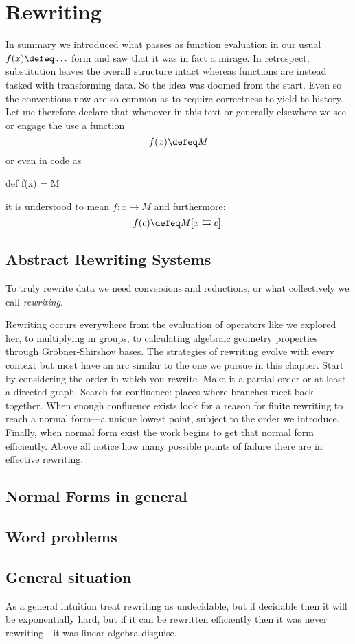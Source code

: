 % 

\section{Rewriting}
In summary we introduced what passes as function evaluation 
in our usual $f(x)\defeq \ldots$ form and saw that it was in fact 
a mirage.  In retrospect, substitution leaves the overall structure 
intact whereas functions are instead tasked with transforming data.
So the idea was doomed from the start.  Even so the conventions now 
are so common as to require correctness to yield to history.
Let me therefore declare that whenever in this text or generally 
elsewhere we see or engage the use a function
\[
    f(x)\defeq M
\]
or even in code as 
\begin{Pcode}[]
def f(x) = M
\end{Pcode}
it is understood to mean $f:x\mapsto M$ and furthermore:
\[
    f(c) \defeq M[x\leftrightarrows c].
\]

\subsection{Abstract Rewriting Systems}
To truly rewrite data we need 
conversions and reductions, or what collectively we call \emph{rewriting}.

Rewriting 
occurs everywhere from the evaluation of operators like we explored her, 
to multiplying in groups, to calculating algebraic geometry properties through 
Gr\"obner-Shirshov bases.  The strategies of rewriting evolve with every context 
but most have an arc similar to the one we pursue in this chapter.  Start by 
considering the order in which you rewrite.  Make it a partial order or at 
least a directed graph.  Search for confluence: places where branches meet back
together.  When enough confluence exists look for a reason for finite rewriting 
to reach a normal form---a unique lowest point, subject to the order we introduce.
Finally, when normal form exist the work begins to get that normal form efficiently.
Above all notice how many possible points of failure there are in effective 
rewriting.  

\subsection{Normal Forms in general}

\subsection{Word problems}

\subsection{General situation}

As a general intuition treat rewriting as undecidable, but if decidable 
then it will be exponentially hard, but if it can be rewritten efficiently 
then it was never rewriting---it was linear algebra disguise.